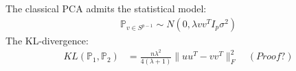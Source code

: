 \begin{example}
	The classical PCA admits the statistical model:
	\begin{align*}
		\mathbb{P}_{v \in S^{p-1}} \sim N(0, \lambda v v^T I_p \sigma^2)
	\end{align*}
	The KL-divergence:
	\begin{align*}
		KL(\mathbb{P}_1, \mathbb{P}_2) &= \frac{n\lambda^2}{4(\lambda + 1)}\|uu^T - vv^T\|_F^2\quad (Proof?)\\
		&\
	\end{align*}
\end{example}


\begin{example}
\end{example}

\begin{example}	
\end{example}








